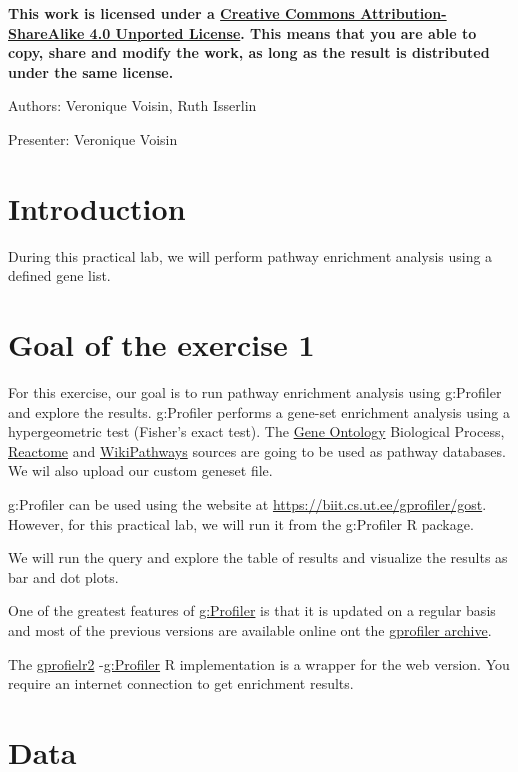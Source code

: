 \documentclass[
]{book}
\begin{document}
\textbf{This work is licensed under a \href{https://creativecommons.org/licenses/by-sa/4.0/deed.en}{Creative Commons Attribution-ShareAlike 4.0 Unported License}. This means that you are able to copy, share and modify the work, as long as the result is distributed under the same license.}

Authors: Veronique Voisin, Ruth Isserlin

Presenter: Veronique Voisin

\section{Introduction}\label{introduction}

During this practical lab, we will perform pathway enrichment analysis using a defined gene list.

\section{Goal of the exercise 1}\label{goal-of-the-exercise-1}

For this exercise, our goal is to run pathway enrichment analysis using g:Profiler and explore the results.
g:Profiler performs a gene-set enrichment analysis using a hypergeometric test (Fisher's exact test). The \href{http://geneontology.org/}{Gene Ontology} Biological Process, \href{https://reactome.org/}{Reactome} and \href{https://www.wikipathways.org/}{WikiPathways} sources are going to be used as pathway databases.
We wil also upload our custom geneset file.

g:Profiler can be used using the website at \url{https://biit.cs.ut.ee/gprofiler/gost}. However, for this practical lab, we will run it from the g:Profiler R package.

We will run the query and explore the table of results and visualize the results as bar and dot plots.

One of the greatest features of \href{https://biit.cs.ut.ee/gprofiler/gost}{g:Profiler} is that it is updated on a regular basis and most of the previous versions are available online ont the \href{https://biit.cs.ut.ee/gprofiler/page/archives}{gprofiler archive}.

The \href{https://biit.cs.ut.ee/gprofiler/page/r}{gprofielr2} -\href{https://biit.cs.ut.ee/gprofiler/gost}{g:Profiler} R implementation is a wrapper for the web version. You require an internet connection to get enrichment results.

\section{Data}\label{data}
\end{document}
